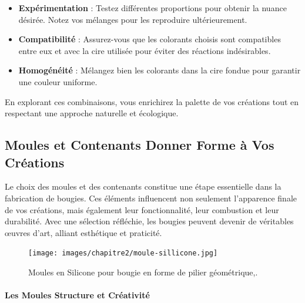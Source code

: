 \documentclass[11pt,fleqn,onecolumn,oneside]{book}
\begin{document}
\begin{itemize}
    \item \textbf{Expérimentation} : Testez différentes proportions pour obtenir la nuance désirée. Notez vos mélanges pour les reproduire ultérieurement.
    \item \textbf{Compatibilité} : Assurez-vous que les colorants choisis sont compatibles entre eux et avec la cire utilisée pour éviter des réactions indésirables.
    \item \textbf{Homogénéité} : Mélangez bien les colorants dans la cire fondue pour garantir une couleur uniforme.
\end{itemize}

En explorant ces combinaisons, vous enrichirez la palette de vos créations tout en respectant une approche naturelle et écologique.

\subsection*{Moules et Contenants Donner Forme à Vos Créations}

\begin{definition}
Le choix des moules et des contenants constitue une étape essentielle dans la fabrication de bougies. Ces éléments influencent non seulement l’apparence finale de vos créations, mais également leur fonctionnalité, leur combustion et leur durabilité. Avec une sélection réfléchie, les bougies peuvent devenir de véritables œuvres d’art, alliant esthétique et praticité.
\end{definition}

\begin{figure}[htbp]
    \centering
    \texttt{[image: images/chapitre2/moule-sillicone.jpg]}
    \caption{Moules en Silicone pour bougie en forme de pilier géométrique,.}
    \label{fig:moule_sillicone}
\end{figure}


\paragraph{Les Moules Structure et Créativité}
\end{document}
